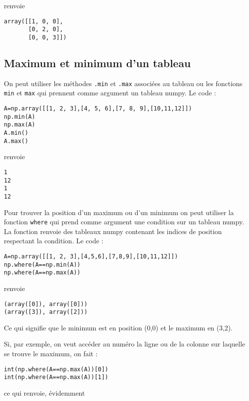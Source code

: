renvoie

\begin{verbatim}
array([[1, 0, 0],
       [0, 2, 0],
       [0, 0, 3]])
\end{verbatim} 


\subsection{Maximum et minimum d'un tableau}

On peut utiliser les méthodes \verb|.min| et \verb|.max| associées au tableau ou les fonctions \verb|min| et \verb|max| qui prennent comme argument un tableau numpy. Le code :

\begin{verbatim}
A=np.array([[1, 2, 3],[4, 5, 6],[7, 8, 9],[10,11,12]])
np.min(A)
np.max(A)
A.min()
A.max()
\end{verbatim}

renvoie 

\begin{verbatim}
1
12
1
12
\end{verbatim} 

Pour trouver la position d'un maximum ou d'un minimum on peut utiliser la fonction \verb|where| qui prend comme argument une condition sur un tableau numpy. La fonction renvoie des tableaux numpy contenant les indices de position respectant la condition. Le code :

\begin{verbatim}
A=np.array([[1, 2, 3],[4,5,6],[7,8,9],[10,11,12]])
np.where(A==np.min(A))
np.where(A==np.max(A))
\end{verbatim}

renvoie 

\begin{verbatim}
(array([0]), array([0]))
(array([3]), array([2]))  
\end{verbatim} 

Ce qui signifie que le minimum est en position (0,0) et le maximum en (3,2). 

Si, par exemple, on veut accéder au numéro la ligne ou de la colonne sur laquelle se trouve le maximum, on fait :

\begin{verbatim}
int(np.where(A==np.max(A))[0])
int(np.where(A==np.max(A))[1])
\end{verbatim}

ce qui renvoie, évidemment

